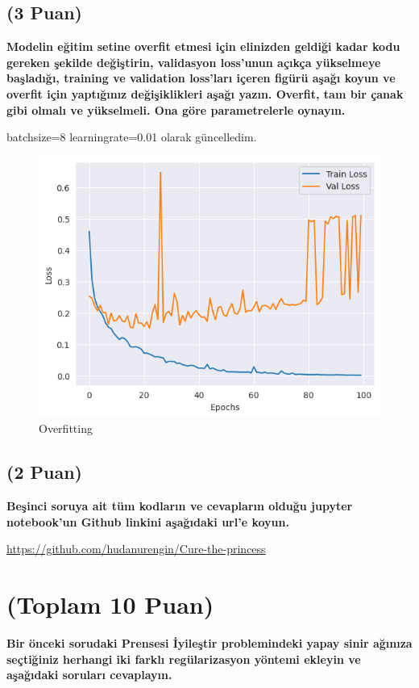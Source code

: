 \documentclass[11pt]{article}
\begin{document}
\subsection{(3 Puan)} \textbf{Modelin eğitim setine overfit etmesi için elinizden geldiği kadar kodu gereken şekilde değiştirin, validasyon loss'unun açıkça yükselmeye başladığı, training ve validation loss'ları içeren figürü aşağı koyun ve overfit için yaptığınız değişiklikleri aşağı yazın. Overfit, tam bir çanak gibi olmalı ve yükselmeli. Ona göre parametrelerle oynayın.}

batchsize=8
learningrate=0.01 olarak güncelledim.
\begin{figure}
    \centering
    \includegraphics{overfit.png}
    \caption{Overfitting}
    \label{fig:my_label}
\end{figure}

\newpage
\subsection{(2 Puan)} \textbf{Beşinci soruya ait tüm kodların ve cevapların olduğu jupyter notebook'un Github linkini aşağıdaki url'e koyun.}

\url{https://github.com/hudanurengin/Cure-the-princess}

\section{(Toplam 10 Puan)} \textbf{Bir önceki sorudaki Prensesi İyileştir problemindeki yapay sinir ağınıza seçtiğiniz herhangi iki farklı regülarizasyon yöntemi ekleyin ve aşağıdaki soruları cevaplayın.} 
\end{document}
